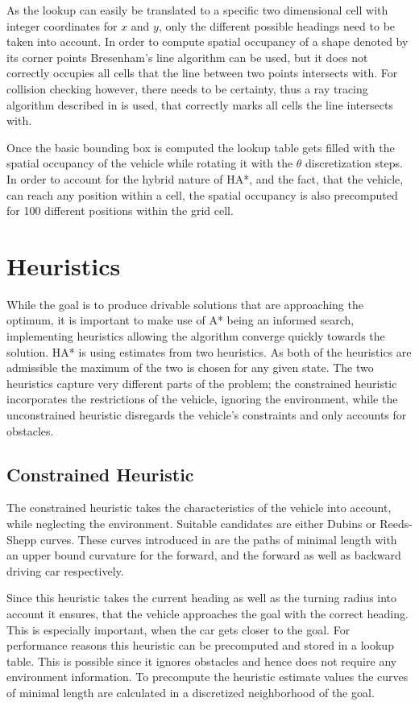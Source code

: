 As the lookup can easily be translated to a specific two dimensional cell with integer coordinates for $x$ and $y$, only the different possible headings need to be taken into account. In order to compute spatial occupancy of a shape denoted by its corner points Bresenham's line algorithm can be used, but it does not correctly occupies all cells that the line between two points intersects with. For collision checking however, there needs to be certainty, thus a ray tracing algorithm described in \cite{Amanatides.2011} is used, that correctly marks all cells the line intersects with.

Once the basic bounding box is computed the lookup table gets filled with the spatial occupancy of the vehicle while rotating it with the $\theta$ discretization steps. In order to account for the hybrid nature of HA*, and the fact, that the vehicle, can reach any position within a cell, the spatial occupancy is also precomputed for 100 different positions within the grid cell.

\section{Heuristics}
While the goal is to produce drivable solutions that are approaching the optimum, it is important to make use of A* being an informed search, implementing heuristics allowing the algorithm converge quickly towards the solution. HA* is using estimates from two heuristics. As both of the heuristics are admissible the maximum of the two is chosen for any given state. The two heuristics capture very different parts of the problem; the constrained heuristic incorporates the restrictions of the vehicle, ignoring the environment, while the unconstrained heuristic disregards the vehicle's constraints and only accounts for obstacles.

\subsection{Constrained Heuristic}
The constrained heuristic takes the characteristics of the vehicle into account, while neglecting the environment. Suitable candidates are either Dubins or Reeds-Shepp curves. These curves introduced in  are the paths of minimal length with an upper bound curvature for the forward, and the forward as well as backward driving car respectively.

Since this heuristic takes the current heading as well as the turning radius into account it ensures, that the vehicle approaches the goal with the correct heading. This is especially important, when the car gets closer to the goal. For performance reasons this heuristic can be precomputed and stored in a lookup table. This is possible since it ignores obstacles and hence does not require any environment information. To precompute the heuristic estimate values the curves of minimal length are calculated in a discretized neighborhood of the goal.

